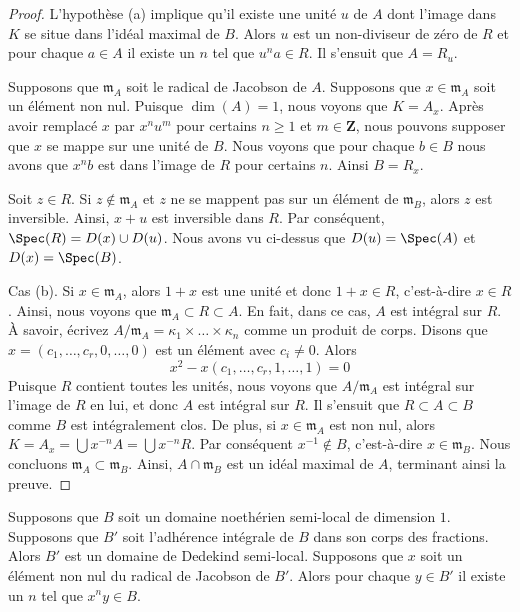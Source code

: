 \begin{proof}
L'hypothèse (a) implique qu'il existe une unité $u$ de $A$ dont
l'image dans $K$ se situe dans l'idéal maximal de $B$. Alors $u$
est un non-diviseur de zéro de $R$ et pour chaque $a \in A$ il
existe un $n$ tel que $u^n a \in R$. Il s'ensuit que $A = R_u$.

\medskip\noindent
Supposons que $\mathfrak m_A$ soit le radical de Jacobson de $A$.
Supposons que $x \in \mathfrak m_A$ soit un élément non nul. Puisque
$\dim(A) = 1$, nous voyons que $K = A_x$. Après avoir remplacé $x$ par $x^n
u^m$ pour certains $n \geq 1$ et $m \in \mathbf{Z}$, nous pouvons supposer que
$x$ se mappe sur une unité de $B$. Nous voyons que pour chaque $b \in B$ nous
avons que $x^nb$ est dans l'image de $R$ pour certains $n$. Ainsi $B = R_x$.

\medskip\noindent
Soit $z \in R$. Si $z \not \in \mathfrak m_A$ et $z$ ne se mappent pas
sur un élément de $\mathfrak m_B$, alors $z$ est inversible. Ainsi, $x
+ u$ est inversible dans $R$. Par conséquent, $\Spec(R) = D(x) \cup
D(u)$. Nous avons vu ci-dessus que $D(u) = \Spec(A)$ et $D(x) = \Spec(B)$.

\medskip\noindent
Cas (b). Si $x \in \mathfrak m_A$, alors $1 + x$ est une
unité et donc $1 + x \in R$, c'est-à-dire $x \in R$. Ainsi,
nous voyons que $\mathfrak m_A \subset R \subset A$. En
fait, dans ce cas, $A$ est intégral sur $R$. À savoir,
écrivez $A/\mathfrak m_A = \kappa_1 \times \ldots \times
\kappa_n$ comme un produit de corps. Disons que $x = (c_1,
\ldots, c_r, 0, \ldots, 0)$ est un élément avec $c_i \not = 0$. Alors
$$
x^2 - x(c_1, \ldots, c_r, 1, \ldots, 1)  = 0
$$
Puisque $R$ contient toutes les unités, nous voyons que
$A/\mathfrak m_A$ est intégral sur l'image de $R$ en lui,
et donc $A$ est intégral sur $R$. Il s'ensuit que $R \subset
A \subset B$ comme $B$ est intégralement clos. De plus, si
$x \in \mathfrak m_A$ est non nul, alors $K = A_x = \bigcup
x^{-n}A = \bigcup x^{-n}R$. Par conséquent $x^{-1} \not \in
B$, c'est-à-dire $x \in \mathfrak m_B$. Nous concluons
$\mathfrak m_A \subset \mathfrak m_B$. Ainsi, $A \cap
\mathfrak m_B$ est un idéal maximal de $A$, terminant ainsi la preuve.
\end{proof}

\begin{lemma}
\label{lemma-semi-local-dimension-one-conductor}
Supposons que $B$ soit un domaine noethérien semi-local de
dimension $1$. Supposons que $B'$ soit l'adhérence
intégrale de $B$ dans son corps des fractions. Alors $B'$
est un domaine de Dedekind semi-local. Supposons que $x$
soit un élément non nul du radical de Jacobson de $B'$. Alors
pour chaque $y \in B'$ il existe un $n$ tel que $x^n y \in B$.
\end{lemma}

